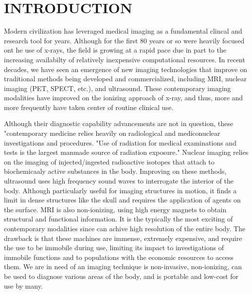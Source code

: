 
\chapter{INTRODUCTION} %
\label{chap:introduction}

Modern civilization has leveraged medical imaging as a fundamental clincal and research tool for years. Although for the first 80 years or so were heavily focused ont he use of x-rays, the field is growing at a rapid pace due in part to the increasing availabilty of relatively inexpensive computational resources. In recent decades, we have seen an emergence of new imaging technologies that improve on traditional methods being developed and commercialized, including MRI, nuclear imaging (PET, SPECT, etc.), and ultrasound. These contemporary imaging modalities have improved on the ionizing approach of x-ray, and thus, more and more frequently have taken center of routine clinical use. 

Although their diagnostic capability advancements are not in question, these "contemporary medicine relies heavily on radiological and mediconuclear investigations and procedures. "Use of radiation for medical examinations and tests is the largest manmade source of radiation exposure." Nuclear imaging relies on the imaging of injected/ingested radioactive isotopes that attach to biochemicaaly active substances in the body. Improving on these methods, ultrasound uses high frequency sound waves to interrogate the interior of the body. Although particularly useful for imaging structures in motion, it finds a limit in dense structures like the skull and requires the application of agents on the surface. MRI is also non-ionizing, using high energy magnets to obtain structural and functional information. It is the typically the most exciting of contemporary modalities since can achive high resolution of the entire body. The drawback is that these machines are immense, extremely expensive, and require the use to be immobile during use, limiting its impact to investigations of immobile functions and to populations with the economic resources to access them. We are in need of an imaging technique is non-invasive, non-ionizing, can be used to diagnose various areas of the body, and is portable and low-cost for use by many.

